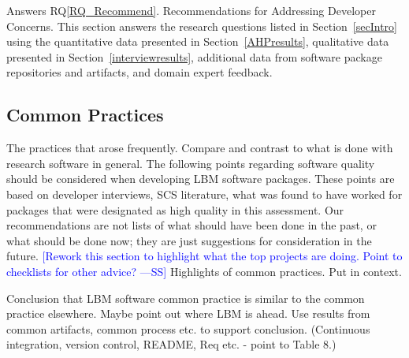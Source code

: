 \documentclass[final, 3p, times, authoryear]{elsarticle}
\newcommand{\authornote}[3]{\textcolor{#1}{[#3 ---#2]}}
\newcommand{\authornote}[3]{}
\newcommand{\wss}[1]{\authornote{blue}{SS}{#1}} %
\newcommand{\rqref}[1]{RQ\ref{#1}}
\begin{document}
Answers \rqref{RQ_Recommend}.  Recommendations for Addressing Developer
Concerns.  This section answers the research questions listed in
Section~\ref{secIntro} using the quantitative data presented in
Section~\ref{AHPresults}, qualitative data presented in
Section~\ref{interviewresults}, additional data from software package
repositories and artifacts, and domain expert feedback.

\subsection{Common Practices} \label{currentPractices}

The practices that arose frequently.  Compare and contrast to what is done with
research software in general.  The following points regarding software quality
should be considered when developing LBM software packages. These points are
based on developer interviews, SCS literature, what was found to have worked for
packages that were designated as high quality in this assessment.  Our
recommendations are not lists of what should have been done in the past, or what
should be done now; they are just suggestions for consideration in the future.
\wss{Rework this section to highlight what the top projects are doing.  Point to
checklists for other advice?}  Highlights of common practices.  Put in context.

Conclusion that LBM software common practice is similar to the common practice
elsewhere.  Maybe point out where LBM is ahead.  Use results from common
artifacts, common process etc. to support conclusion.  (Continuous integration,
version control, README, Req etc. - point to Table 8.)
\end{document}
